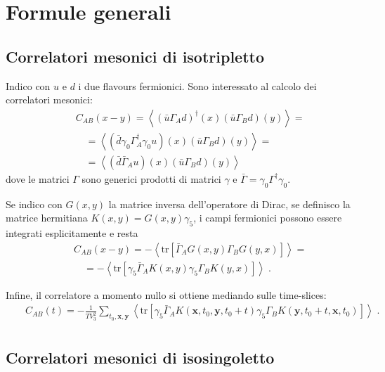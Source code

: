 \documentclass[a4paper]{article}
\newcommand{\tr}{\mathrm{tr}}
\newcommand{\point}{\; .}
\begin{document}
\section{Formule generali}



\subsection{Correlatori mesonici di isotripletto}

Indico con $u$ e $d$ i due flavours fermionici. Sono interessato al calcolo dei correlatori mesonici:
\begin{eqnarray}
&& C_{AB}(x-y) = \left<
\left( \bar{u} \Gamma_A d \right)^\dagger(x)
\left( \bar{u} \Gamma_B d \right)(y)
\right> = \nonumber \\
&& \quad = \left<
\left( \bar{d} \gamma_0 \Gamma_A^\dagger \gamma_0 u \right)(x)
\left( \bar{u} \Gamma_B d \right)(y)
\right> = \nonumber \\
&& \quad = \left<
\left( \bar{d} \bar{\Gamma}_A u \right)(x)
\left( \bar{u} \Gamma_B d \right)(y)
\right>
\end{eqnarray}
dove le matrici $\Gamma$ sono generici prodotti di matrici $\gamma$ e $\bar{\Gamma} = \gamma_0 \Gamma^\dagger \gamma_0$.

Se indico con $G(x,y)$ la matrice inversa dell'operatore di Dirac, se definisco la matrice hermitiana $K(x,y) = G(x,y) \gamma_5$, i campi fermionici possono essere integrati esplicitamente e resta
\begin{eqnarray}
&& C_{AB}(x-y) = - \left< \tr
\left[ \bar{\Gamma}_A G(x,y) \Gamma_B G(y,x) \right]
\right> = \nonumber \\
&& \quad = - \left< \tr
\left[ \gamma_5 \bar{\Gamma}_A K(x,y) \gamma_5 \Gamma_B K(y,x) \right]
\right> \point
\end{eqnarray}

Infine, il correlatore a momento nullo si ottiene mediando sulle time-slices:
\begin{eqnarray}
&& C_{AB}(t) = - \frac{1}{T V_3^2} \sum_{t_0,\mathbf{x},\mathbf{y}}
\left< \tr
\left[ \gamma_5 \bar{\Gamma}_A K(\mathbf{x},t_0,\mathbf{y},t_0+t) \gamma_5 \Gamma_B K(\mathbf{y},t_0+t,\mathbf{x},t_0) \right]
\right> \point \nonumber \\
&&
\end{eqnarray}




\subsection{Correlatori mesonici di isosingoletto}
\end{document}

